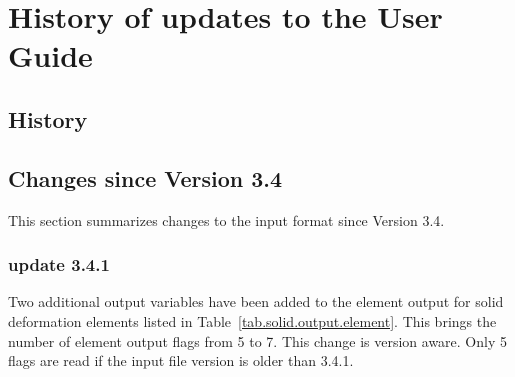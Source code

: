 
\section{History of updates to the \tahoe User Guide}

\subsection{History}
\subsection{Changes since Version 3.4}
\label{sect.changes.log}
This section summarizes changes to the \tahoe input format
since Version 3.4.
\subsubsection{update 3.4.1}
Two additional output variables have been added to the element output 
for solid deformation elements listed in 
Table~\ref{tab.solid.output.element}. This brings the number of 
element output flags from 5 to 7. This change is version aware. Only 5 
flags are read if the input file version is older than 3.4.1.
